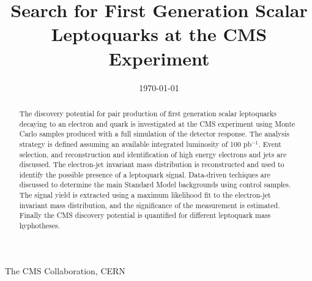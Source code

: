 \documentclass{cmspaper}
\begin{document}
\begin{linenumbers}

\begin{titlepage}



\date{\today}

\title{Search for First Generation Scalar Leptoquarks at the CMS Experiment}


  \begin{Authlist}
    The CMS Collaboration, CERN
  \end{Authlist}


  \begin{abstract}
    The discovery potential for pair production of first generation scalar leptoquarks 
    decaying to an electron and quark is investigated 
    at the CMS experiment using Monte Carlo samples produced with a full simulation of the detector response.  
    The analysis strategy is defined assuming an available integrated luminosity of 100 pb$^{-1}$.
    Event selection, and reconstruction and identification of high energy electrons and jets are discussed.
    The electron-jet invariant mass distribution is reconstructed
    and used to identify the possible presence of a leptoquark signal.
    Data-driven techiques are discussed to determine the main Standard Model backgrounds using 
    control samples. The signal yield is extracted using a maximum likelihood fit to the 
    electron-jet invariant mass distribution, and the significance of the measurement is estimated.
    Finally the CMS discovery potential is quantified for different leptoquark mass hyphotheses.

  \end{abstract} 

\end{titlepage}


\end{linenumbers}
\end{document}
